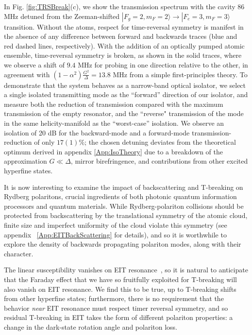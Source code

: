 \documentclass[aps,pra,twocolumn,groupedaddress,10pt,showpacs]{revtex4-1}
\newcommand{\ket}[1]{| #1\rangle}
\begin{document}
In Fig. \ref{fig:TRSBreak}(c), we show the transmission spectrum with the cavity 86 MHz detuned from the Zeeman-shifted $\ket{F_g=2,m_F=2}\rightarrow\ket{F_e=3,m_F=3}$ transition. Without the atoms, respect for time-reversal symmetry is manifest in the absence of any difference between forward and backwards traces (blue and red dashed lines, respectively). With the addition of an optically pumped atomic ensemble, time-reversal symmetry is broken, as shown in the solid traces, where we observe a shift of $9.4$ MHz for probing in one direction relative to the other, in agreement with $(1-\alpha^2)\frac{G^2}{\Delta}=13.8$ MHz from a simple first-principles theory. To demonstrate that the system behaves as a narrow-band optical isolator, we select a single isolated transmitting mode as the ``forward'' direction of our isolator, and measure both the reduction of transmission compared with the maximum transmission of the empty resonator, and the ``reverse" transmission of the mode in the same helicity-manifold as the ``worst-case'' isolation. We observe an isolation of 20 dB for the backward-mode and a forward-mode transmission-reduction of only $17(1)\%$; the chosen detuning deviates from the theoretical optimum derived in appendix \ref{App:IsoTheory} due to a breakdown of the approximation $G\ll\Delta$, mirror birefringence, and contributions from other excited hyperfine states. 

It is now interesting to examine the impact of backscattering and T-breaking on Rydberg polaritons, crucial ingredients of both photonic quantum information processors and quantum materials. While Rydberg-polariton collisions should be protected from backscattering by the translational symmetry of the atomic cloud, finite size and imperfect uniformity of the cloud violate this symmetry (see appendix ~\ref{App:EITBackScattering} for details), and so it is worthwhile to explore the density of backwards propagating polariton modes, along with their character.

The linear susceptibility vanishes on EIT resonance~\cite{flei2000dark}, so it is natural to anticipate that the Faraday effect that we have so fruitfully exploited for T-breaking will also vanish on EIT resonance. We find this to be true, up to T-breaking shifts from other hyperfine states; furthermore, there is no requirement that the behavior \emph{near} EIT resonance must respect timer reversal symmetry, and so residual T-breaking in EIT takes the form of different polariton properties: a change in the dark-state rotation angle and polariton loss.
\end{document}
